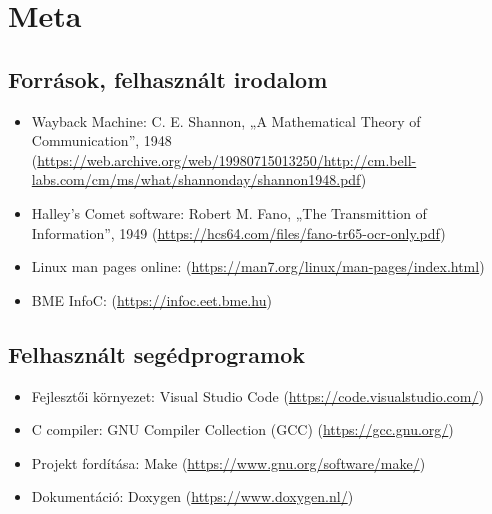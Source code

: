 \chapter{Meta}
\section{Források, felhasznált irodalom}
\begin{itemize}
    \item Wayback Machine: C. E. Shannon, „A Mathematical Theory of Communication”, 1948 (\href{https://web.archive.org/web/19980715013250/http://cm.bell-labs.com/cm/ms/what/shannonday/shannon1948.pdf}{https://web.archive.org/web/19980715013250/http://cm.bell-labs.com/cm/ms/what/shannonday/shannon1948.pdf})
    \item Halley's Comet software: Robert M. Fano, „The Transmittion of Information”, 1949 (\href{https://hcs64.com/files/fano-tr65-ocr-only.pdf}{https://hcs64.com/files/fano-tr65-ocr-only.pdf})
    \item Linux man pages online: (\href{https://man7.org/linux/man-pages/index.html}{https://man7.org/linux/man-pages/index.html})
    \item BME InfoC: (\href{https://infoc.eet.bme.hu}{https://infoc.eet.bme.hu})
\end{itemize}

\section{Felhasznált segédprogramok}
\begin{itemize}
    \item Fejlesztői környezet: Visual Studio Code (\href{https://code.visualstudio.com/}{https://code.visualstudio.com/})
    \item C compiler: GNU Compiler Collection (GCC) (\href{https://gcc.gnu.org/}{https://gcc.gnu.org/})
    \item Projekt fordítása: Make (\href{https://www.gnu.org/software/make/}{https://www.gnu.org/software/make/})
    \item Dokumentáció: Doxygen (\href{https://www.doxygen.nl/}{https://www.doxygen.nl/})
\end{itemize}